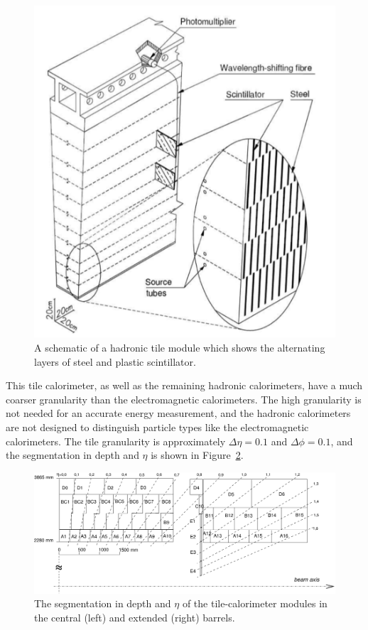 \begin{figure}[hbtp]
\includegraphics[width=\fullfig]{figures/hadronic_tile.png}
\caption{A schematic of a hadronic tile module which shows the alternating layers of steel and plastic scintillator.}
\label{fig:hadronic_tile}
\end{figure}

This tile calorimeter, as well as the remaining hadronic calorimeters, have a much coarser granularity than the electromagnetic calorimeters.
The high granularity is not needed for an accurate energy measurement, and the hadronic calorimeters are not designed to distinguish particle types like the electromagnetic calorimeters.
The tile granularity is approximately $\Delta\eta = 0.1$ and $\Delta\phi = 0.1$, and the segmentation in depth and $\eta$ is shown in Figure~\ref{fig:tile_segmentation}.

\begin{figure}[hbtp]
\includegraphics[width=\fullfig]{figures/tile_segmentation.pdf}
\caption{The segmentation in depth and $\eta$ of the tile-calorimeter modules in the central (left) and extended (right) barrels.}
\label{fig:tile_segmentation}
\end{figure}

